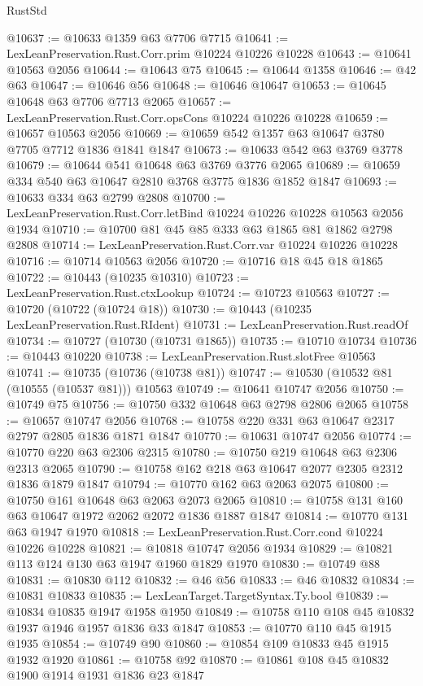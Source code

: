 \begin{lexlean}{RustStd}
\begin{coremodule}
@10637 := @10633 @1359 @63 @7706 @7715
@10641 := LexLeanPreservation.Rust.Corr.prim @10224 @10226 @10228
@10643 := @10641 @10563 @2056
@10644 := @10643 @75
@10645 := @10644 @1358
@10646 := @42 @63
@10647 := @10646 @56
@10648 := @10646 @10647
@10653 := @10645 @10648 @63 @7706 @7713 @2065
@10657 := LexLeanPreservation.Rust.Corr.opsCons @10224 @10226 @10228
@10659 := @10657 @10563 @2056
@10669 := @10659 @542 @1357 @63 @10647 @3780 @7705 @7712 @1836 @1841 @1847
@10673 := @10633 @542 @63 @3769 @3778
@10679 := @10644 @541 @10648 @63 @3769 @3776 @2065
@10689 := @10659 @334 @540 @63 @10647 @2810 @3768 @3775 @1836 @1852 @1847
@10693 := @10633 @334 @63 @2799 @2808
@10700 := LexLeanPreservation.Rust.Corr.letBind @10224 @10226 @10228 @10563 @2056 @1934
@10710 := @10700 @81 @45 @85 @333 @63 @1865 @81 @1862 @2798 @2808
@10714 := LexLeanPreservation.Rust.Corr.var @10224 @10226 @10228
@10716 := @10714 @10563 @2056
@10720 := @10716 @18 @45 @18 @1865
@10722 := @10443 (@10235 @10310)
@10723 := LexLeanPreservation.Rust.ctxLookup
@10724 := @10723 @10563
@10727 := @10720 (@10722 (@10724 @18))
@10730 := @10443 (@10235 LexLeanPreservation.Rust.RIdent)
@10731 := LexLeanPreservation.Rust.readOf
@10734 := @10727 (@10730 (@10731 @1865))
@10735 := @10710 @10734
@10736 := @10443 @10220
@10738 := LexLeanPreservation.Rust.slotFree @10563
@10741 := @10735 (@10736 (@10738 @81))
@10747 := @10530 (@10532 @81 (@10555 (@10537 @81))) @10563
@10749 := @10641 @10747 @2056
@10750 := @10749 @75
@10756 := @10750 @332 @10648 @63 @2798 @2806 @2065
@10758 := @10657 @10747 @2056
@10768 := @10758 @220 @331 @63 @10647 @2317 @2797 @2805 @1836 @1871 @1847
@10770 := @10631 @10747 @2056
@10774 := @10770 @220 @63 @2306 @2315
@10780 := @10750 @219 @10648 @63 @2306 @2313 @2065
@10790 := @10758 @162 @218 @63 @10647 @2077 @2305 @2312 @1836 @1879 @1847
@10794 := @10770 @162 @63 @2063 @2075
@10800 := @10750 @161 @10648 @63 @2063 @2073 @2065
@10810 := @10758 @131 @160 @63 @10647 @1972 @2062 @2072 @1836 @1887 @1847
@10814 := @10770 @131 @63 @1947 @1970
@10818 := LexLeanPreservation.Rust.Corr.cond @10224 @10226 @10228
@10821 := @10818 @10747 @2056 @1934
@10829 := @10821 @113 @124 @130 @63 @1947 @1960 @1829 @1970
@10830 := @10749 @88
@10831 := @10830 @112
@10832 := @46 @56
@10833 := @46 @10832
@10834 := @10831 @10833
@10835 := LexLeanTarget.TargetSyntax.Ty.bool
@10839 := @10834 @10835 @1947 @1958 @1950
@10849 := @10758 @110 @108 @45 @10832 @1937 @1946 @1957 @1836 @33 @1847
@10853 := @10770 @110 @45 @1915 @1935
@10854 := @10749 @90
@10860 := @10854 @109 @10833 @45 @1915 @1932 @1920
@10861 := @10758 @92
@10870 := @10861 @108 @45 @10832 @1900 @1914 @1931 @1836 @23 @1847

\end{coremodule}
\end{lexlean}
